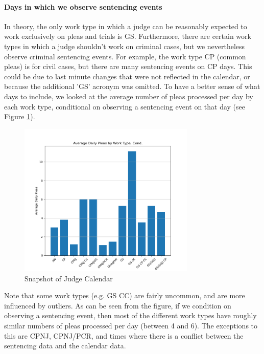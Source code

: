 \documentclass[11pt]{article}
\theoremstyle{ModifiedStyle}
\theoremstyle{ModifiedStyle}
\begin{document}
    \paragraph{Days in which we observe sentencing events}
      In theory, the only work type in which a judge can be reasonably expected to work exclusively on pleas and trials is GS. Furthermore, there are certain work types in which a judge shouldn't work on criminal cases, but we nevertheless observe criminal sentencing events. For example, the work type CP (common pleas) is for civil cases, but there are many sentencing events on CP days. This could be due to last minute changes that were not reflected in the calendar, or because the additional 'GS' acronym was omitted. To have a better sense of what days to include, we looked at the average number of pleas processed per day by each work type, conditional on observing a sentencing event on that day (see Figure \ref{fig-cond-avg}).
      \begin{figure}[H]
          \centering
          \caption{Snapshot of Judge Calendar}
          \label{fig-cond-avg}
          \includegraphics[width=0.75\textwidth, keepaspectratio=true]{../../output/figures/Exploration/avg_pleas_by_worktype_cond.png}
        \end{figure}

      Note that some work types (e.g. GS CC) are fairly uncommon, and are more influenced by outliers. As can be seen from the figure, if we condition on observing a sentencing event, then most of the different work types have roughly similar numbers of pleas processed per day (between 4 and 6). The exceptions to this are CPNJ, CPNJ/PCR, and times where there is a conflict between the sentencing data and the calendar data.
\end{document}
